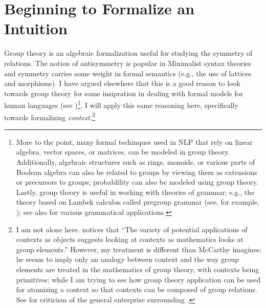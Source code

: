 \documentclass[11pt]{article}
\begin{document}
\section{Beginning to Formalize an Intuition}
Group theory is an algebraic formalization useful for studying the symmetry of relations. The notion of antisymmetry is popular in Minimalist syntax theories and symmetry carries some weight in formal semantics (e.g., the use of lattices and
morphisms). I have argued elsewhere that this is a good reason to look towards group theory for
some insipration in dealing with formal models for human languages (see
\citealt{bowles09amerge})\footnote{More to the point, many formal techinques used in NLP that rely
on linear algebra, vector spaces, or matrices, can be modeled in group theory. Additionally,
algebraic structures such as rings, monoids, or various parts of Boolean algebra can also be related
to groups by viewing them as extensions or precursors to groups; probablility can also be modeled using group
theory. Lastly, group theory is useful in working with theories of grammar; e.g.,
the theory based on Lambek calculus called pregroup grammar (see, for
example, \citealt{stabler04tpg}); see also \cite{dymetman98groupcompling,dymetman98grouplingprocess} for various grammatical applications.}. I will apply this same reasoning here,
specifically towards formalizing \textsl{context}.\footnote{I am not alone here.
 notices that ``The variety of potential
applications of contexts as objects suggests looking at contexts as mathematics
looks at group elements.'' However, my treatment is different than McCarthy imagines: he seems to imply only an analogy between context and the way group elements are treated in the mathematics of group theory, with contexts being primitives; while I am trying to see how group theory application can be used for atomizing a context so that contexts can be composed of group relations. See \cite{hirst00spuriouscontext} for criticism of the general enterprise surrounding \cite{mccarthy96logicaicontext}.}
\end{document}
